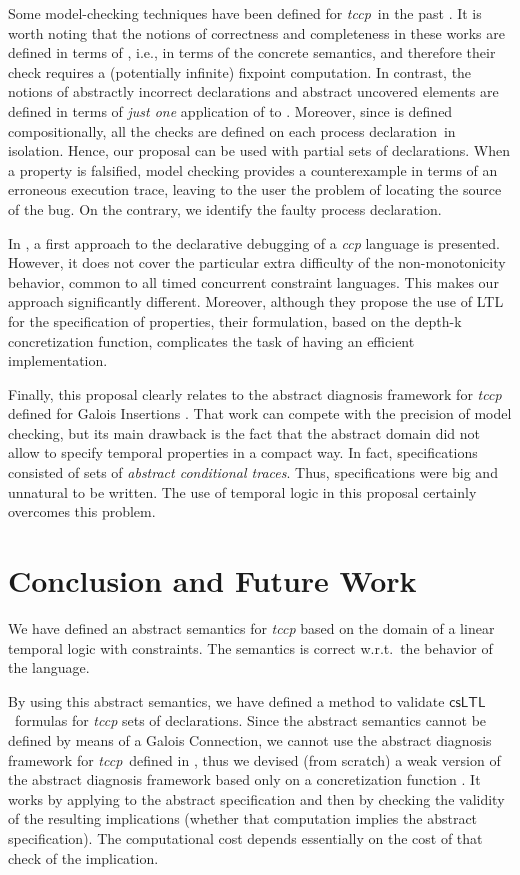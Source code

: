 \documentclass[american]{new_tlp}
\newcommand*{\ccp}{\textit{ccp}}
\newcommand*{\csltl}[1][]{\ensuremath{\textsf{csLTL}_{#1}}}
\newcommand*{\ltl}{\textsf{LTL}}
\newcommand*{\programs}{sets of declarations}
\newcommand*{\progrule}{process declaration}
\newcommand*{\tccp}{\textit{tccp}}
\providecommand*{\ie}   {i.e.,}
\providecommand*{\wrt}  {w.r.t.}
\begin{document}
Some model-checking techniques have been defined for \tccp\ in the past
\cite{FalaschiV06,AlpuenteFV05,AlpuenteGPV05,FalaschiPV01}.  It is
worth noting that the notions of correctness and completeness in these
works are defined in terms of , \ie{} in terms of the
concrete semantics, and therefore their check requires a (potentially
infinite) fixpoint computation.  In contrast, the notions of abstractly
incorrect declarations and abstract uncovered elements are defined in
terms of \emph{just one} application of  to .
Moreover, since  is defined compositionally, all the checks
are defined on each \progrule\ in isolation.  Hence, our proposal can
be used with partial \programs.  When a property is falsified, model
checking provides a counterexample in terms of an erroneous execution
trace, leaving to the user the problem of locating the source of the
bug.  On the contrary, we identify the faulty process declaration.


In \cite{FalaschiOPV07}, a first approach to the declarative
debugging of a \ccp{} language is presented.  However, it does
not cover the particular extra difficulty of the
non-monotonicity behavior, common to all timed concurrent
constraint languages.  This makes our approach significantly
different.  Moreover, although they propose the use of \ltl{}
for the specification of properties, their formulation, based
on the depth-k concretization function, complicates the task of
having an efficient implementation.

Finally, this proposal clearly relates to the abstract diagnosis framework
for \tccp{} defined for Galois Insertions \cite{CominiTV11absdiag}.  That
work can compete with the precision of model checking, but its main
drawback is the fact that the abstract domain did not allow to specify
temporal properties in a compact way.  In fact, specifications consisted of
sets of \emph{abstract conditional traces}.  Thus, specifications were big
and unnatural to be written.  The use of temporal logic in this proposal
certainly overcomes this problem.


\section{Conclusion and Future Work}

We have defined an abstract semantics for \tccp{} based on the domain of a
linear temporal logic with constraints.  The semantics is correct \wrt\ the
behavior of the language.

By using this abstract semantics, we have defined a method to validate
\csltl\ formulas for \tccp{} \programs.  Since the abstract semantics
cannot be defined by means of a Galois Connection, we cannot use the
abstract diagnosis framework for \tccp\ defined in
\cite{CominiTV11absdiag}, thus we devised (from scratch) a weak version of
the abstract diagnosis framework based only on a concretization function
.  It works by applying  to the abstract specification
and then by checking the validity of the resulting implications (whether
that computation implies the abstract specification).  The computational
cost depends essentially on the cost of that check of the implication.
\end{document}
